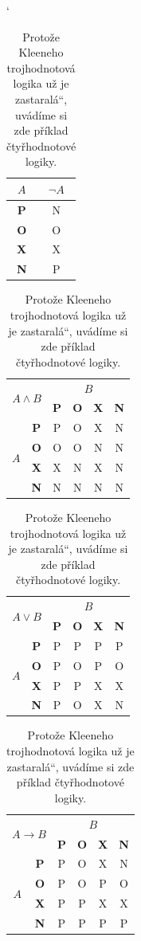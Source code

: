 \documentclass[a4paper, 11pt, ]{article}
\providecommand{\uv} [1] {\quotedblbase #1\textquotedblleft}
\begin{document}
\begin{table}[ht]
\catcode`
\begin{tabular}{ | c | c |}
\hline
$A$ & $\neg A$\\
\hline
\textbf{P} & N\\
\hline
\textbf{O} & O\\
\hline
\textbf{X} & X\\
\hline
\textbf{N} & P\\
\hline 
\end{tabular}
\begin{tabular}{| c | c | c | c | c | c |}
\hline
\multicolumn{2}{|c|}{\multirow{2}{*}{$A\wedge B$}} & \multicolumn{4}{|c|}{$B$} \\
\cline{3-6}
\multicolumn{2}{|c|}{}
& \textbf{P} & \textbf{O} & \textbf{X} & \textbf{N}\\
\hline
\multirow{4}{*}{$A$} & \textbf{P} & P & O & X & N\\
\cline{2-6}
& \textbf{O} & O & O & N & N\\
\cline{2-6}
& \textbf{X} & X & N & X & N\\
\cline{2-6}
& \textbf{N} & N & N & N & N\\
\hline
\end{tabular}
\begin{tabular}{| c | c | c | c | c | c |}
\hline
\multicolumn{2}{|c|}{\multirow{2}{*}{$A\vee B$}} & \multicolumn{4}{|c|}{$B$} \\
\cline{3-6}
\multicolumn{2}{|c|}{}
& \textbf{P} & \textbf{O} & \textbf{X} & \textbf{N}\\
\hline
\multirow{4}{*}{$A$} & \textbf{P} & P & P & P & P\\
\cline{2-6}
& \textbf{O} & P & O & P & O\\
\cline{2-6}
& \textbf{X} & P & P & X & X\\
\cline{2-6}
& \textbf{N} & P & O & X & N\\
\hline
\end{tabular}
\begin{tabular}{| c | c | c | c | c | c |}
\hline
\multicolumn{2}{|c|}{\multirow{2}{*}{$A\rightarrow B$}} & \multicolumn{4}{|c|}{$B$} \\
\cline{3-6}
\multicolumn{2}{|c|}{}
& \textbf{P} & \textbf{O} & \textbf{X} & \textbf{N}\\
\hline
\multirow{4}{*}{$A$} & \textbf{P} & P & O & X & N\\
\cline{2-6}
& \textbf{O} & P & O & P & O\\
\cline{2-6}
& \textbf{X} & P & P & X & X\\
\cline{2-6}
& \textbf{N} & P & P & P & P\\
\hline
\end{tabular}
\caption{Protože Kleeneho trojhodnotová logika už je \uv{zastaralá}, uvádíme si zde příklad čtyřhodnotové logiky.}
\label{tab2}
\end{table}
\end{document}
